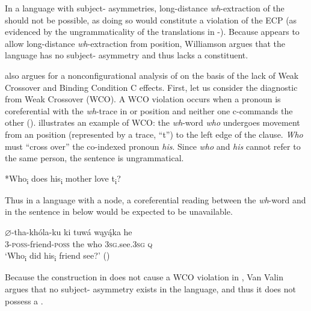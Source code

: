 \documentclass[output=paper]{LSP/langsci}
\begin{document}
In a language with subject- asymmetries, long-distance \textit{wh}-extraction of the  should not be possible, as doing so would constitute a violation of the ECP (as evidenced by the ungrammaticality of the  translations in -).  Because  appears to allow long-distance \textit{wh}-extraction from  position, Williamson argues that the language has no subject- asymmetry and thus lacks a  constituent.

\citet{VanValin1985,VanValin1987} also argues for a nonconfigurational analysis of  on the basis of the lack of Weak Crossover and Binding Condition C effects.  First, let us consider the diagnostic from Weak Crossover (WCO). A WCO violation occurs when a pronoun is coreferential with the \textit{wh}-trace in  or  position and neither one c-commands the other (\citealt{Sportiche1985}).   illustrates an  example of WCO: the \textit{wh}-word \textit{who} undergoes movement from an  position (represented by a trace, ``t'') to the left edge of the clause. \textit{Who} must ``cross over'' the co-indexed pronoun \textit{his}. Since \textit{who} and \textit{his} cannot refer to the same person, the sentence is ungrammatical. 

\begin{exe}
\ex\label{ex:jrs:9}  *Who\textsubscript{i} does his\textsubscript{i} mother love t\textsubscript{i}?
\end{exe}

Thus in a language with a  node, a coreferential reading between the \textit{wh}-word and  in the sentence in  below would be expected to be unavailable.

\begin{exe}
\ex\label{ex:jrs:10} \gll $\varnothing$-tha-kh\'ola-ku 	ki	tuw\'a	wąy\k{\'a}ka	he \\
3-\textsc{poss}-friend-\textsc{poss} the who		\textsc{3sg}.see.\textsc{3sg} 	\textsc{q} \\
\trans `Who\textsubscript{i} did his\textsubscript{i}  friend see?' (\citealt[379]{VanValin1987})
\end{exe}

Because the construction in  does not cause a WCO violation in , Van Valin argues that no subject- asymmetry exists in the language, and thus it does not possess a .
	
\end{document}
